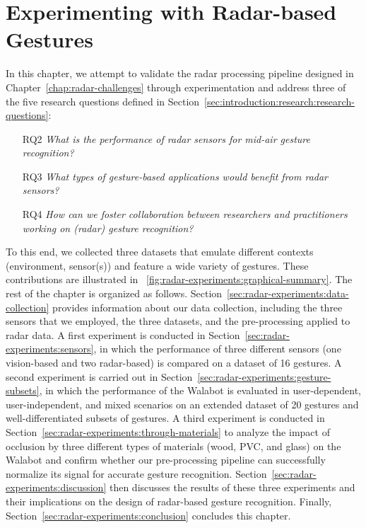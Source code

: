 \chapter{Experimenting with Radar-based Gestures}
\label{chap:radar-experiments}

In this chapter, we attempt to validate the radar processing pipeline designed in Chapter~\ref{chap:radar-challenges} through experimentation and address three of the five research questions defined in Section~\ref{sec:introduction:research:research-questions}: 
\begin{itemize}
    \item [RQ2] \textit{What is the performance of radar sensors for mid-air gesture recognition?}
    \item [RQ3] \textit{What types of gesture-based applications would benefit from radar sensors?}
    \item [RQ4] \textit{How can we foster collaboration between researchers and practitioners working on (radar) gesture recognition?}
\end{itemize}
To this end, we collected three datasets that emulate different contexts (environment, sensor(s)) and feature a wide variety of gestures. These contributions are illustrated in \fig~\ref{fig:radar-experiments:graphical-summary}. The rest of the chapter is organized as follows.
%
Section~\ref{sec:radar-experiments:data-collection} provides information about our data collection, including the three sensors that we employed, the three datasets, and the pre-processing applied to radar data.
%
A first experiment is conducted in Section~\ref{sec:radar-experiments:sensors}, in which the performance of three different sensors (one vision-based and two radar-based) is compared on a dataset of 16 gestures.
%
A second experiment is carried out in Section~\ref{sec:radar-experiments:gesture-subsets}, in which the performance of the Walabot is evaluated in user-dependent, user-independent, and mixed scenarios on an extended dataset of 20 gestures and well-differentiated subsets of gestures.
%
A third experiment is conducted in Section~\ref{sec:radar-experiments:through-materials} to analyze the impact of occlusion by three different types of materials (wood, PVC, and glass) on the Walabot and confirm whether our pre-processing pipeline can successfully normalize its signal for accurate gesture recognition.
%
Section~\ref{sec:radar-experiments:discussion} then discusses the results of these three experiments and their implications on the design of radar-based gesture recognition.
%
Finally, Section~\ref{sec:radar-experiments:conclusion} concludes this chapter.

